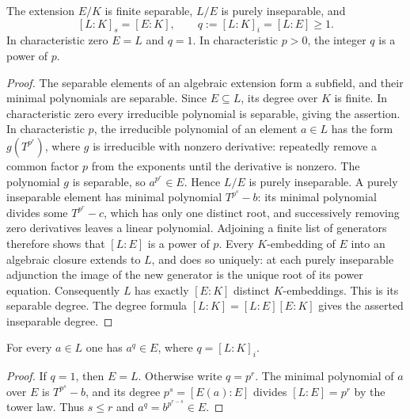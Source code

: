 \begin{lemma}
\label{lem:finite-separable-part}
\mathlibok
{}
The extension $E/K$ is finite separable, $L/E$ is purely inseparable,
and
\[
 [L:K]_s=[E:K],\qquad q:=[L:K]_i=[L:E]\geq1.
\]
In characteristic zero $E=L$ and $q=1$. In characteristic $p>0$, the
integer $q$ is a power of $p$.
\end{lemma}
\begin{proof}
The separable elements of an algebraic extension form a subfield, and
their minimal polynomials are separable. Since $E\subseteq L$, its
degree over $K$ is finite. In characteristic zero every irreducible
polynomial is separable, giving the assertion. In characteristic $p$,
the irreducible polynomial of an element $a\in L$ has the form
$g(T^{p^r})$, where $g$ is irreducible with nonzero derivative: repeatedly
remove a common factor $p$ from the exponents until the derivative is
nonzero. The polynomial $g$ is separable, so $a^{p^r}\in E$. Hence
$L/E$ is purely inseparable. A purely inseparable element has minimal
polynomial $T^{p^s}-b$: its minimal polynomial divides some
$T^{p^r}-c$, which has only one distinct root, and successively removing
zero derivatives leaves a linear polynomial. Adjoining a finite list
of generators therefore shows that $[L:E]$ is a power of $p$.
Every $K$-embedding of $E$ into an algebraic closure extends to $L$,
and does so uniquely: at each purely inseparable adjunction the image
of the new generator is the unique root of its power equation.
Consequently $L$ has exactly $[E:K]$ distinct $K$-embeddings. This is
its separable degree. The degree formula
$[L:K]=[L:E][E:K]$ gives the asserted inseparable degree.
\end{proof}

\begin{lemma}
\label{lem:inseparable-power}
\leanok
{}
For every $a\in L$ one has $a^q\in E$, where $q=[L:K]_i$.
\end{lemma}
\begin{proof}
If $q=1$, then $E=L$. Otherwise write $q=p^r$. The minimal polynomial
of $a$ over $E$ is $T^{p^s}-b$, and its degree $p^s=[E(a):E]$ divides
$[L:E]=p^r$ by the tower law. Thus $s\leq r$ and
$a^q=b^{p^{r-s}}\in E$.
\end{proof}

